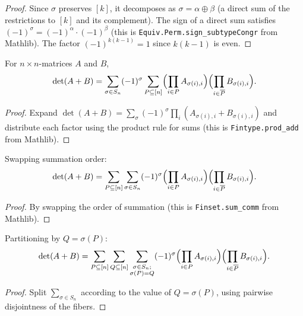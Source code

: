 \begin{proof}
\leanok
Since $\sigma$ preserves $[k]$, it decomposes as
$\sigma = \alpha \oplus \beta$
(a direct sum of the restrictions to $[k]$ and its complement).
The sign of a direct sum satisfies
$(-1)^\sigma = (-1)^\alpha \cdot (-1)^\beta$
(this is \texttt{Equiv.Perm.sign\_subtypeCongr} from Mathlib).
The factor $(-1)^{k(k-1)} = 1$ since $k(k-1)$ is even.
\end{proof}

\begin{lemma}
\label{lem.det.add.step1}
\leanhelper
\leanok
For $n\times n$-matrices $A$ and $B$,
\[
\det(A+B) = \sum_{\sigma\in S_n} (-1)^{\sigma}
\sum_{P\subseteq [n]}
\Bigl(\prod_{i\in P} A_{\sigma(i),i}\Bigr)
\Bigl(\prod_{i\in \overline{P}} B_{\sigma(i),i}\Bigr).
\]
\end{lemma}

\begin{proof}
Expand $\det(A+B) = \sum_{\sigma} (-1)^{\sigma} \prod_i (A_{\sigma(i),i} + B_{\sigma(i),i})$
and distribute each factor using the product rule for sums
(this is \texttt{Fintype.prod\_add} from Mathlib).
\end{proof}

\begin{lemma}
\label{lem.det.add.step2}
\leanhelper
\leanok
Swapping summation order:
\[
\det(A+B) = \sum_{P\subseteq [n]} \sum_{\sigma\in S_n}
(-1)^{\sigma}
\Bigl(\prod_{i\in P} A_{\sigma(i),i}\Bigr)
\Bigl(\prod_{i\in \overline{P}} B_{\sigma(i),i}\Bigr).
\]
\end{lemma}

\begin{proof}
By swapping the order of summation
(this is \texttt{Finset.sum\_comm} from Mathlib).
\end{proof}

\begin{lemma}
\label{lem.det.add.step3}
\leanhelper
\leanok
Partitioning by $Q = \sigma(P)$:
\[
\det(A+B) = \sum_{P\subseteq [n]} \sum_{Q\subseteq [n]}
\sum_{\substack{\sigma\in S_n;\\ \sigma(P) = Q}}
(-1)^{\sigma}
\Bigl(\prod_{i\in P} A_{\sigma(i),i}\Bigr)
\Bigl(\prod_{i\in \overline{P}} B_{\sigma(i),i}\Bigr).
\]
\end{lemma}

\begin{proof}
Split $\sum_{\sigma\in S_n}$ according to the value of
$Q = \sigma(P)$, using pairwise disjointness of the fibers.
\end{proof}

